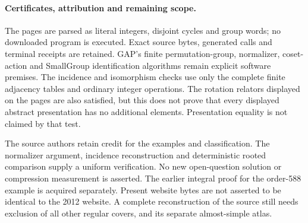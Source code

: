 \documentclass[11pt,a4paper]{article}
\begin{document}
\paragraph{Certificates, attribution and remaining scope.}
The pages are parsed as literal integers, disjoint cycles and group
words; no downloaded program is executed. Exact source bytes, generated
calls and terminal receipts are retained. GAP's finite permutation-group,
normalizer, coset-action and SmallGroup identification algorithms remain
explicit software premises. The incidence and isomorphism checks use
only the complete finite adjacency tables and ordinary integer operations.
The rotation relators displayed on the pages are also satisfied, but
this does not prove that every displayed abstract presentation has no
additional elements. Presentation equality is not claimed by that test.

The source authors retain credit for the examples and classification.
The normalizer argument, incidence reconstruction and deterministic
rooted comparison supply a uniform verification. No new open-question
solution or compression measurement is asserted. The earlier integral
proof for the order-588 example is acquired separately. Present website
bytes are not asserted to be identical to the 2012 website. A complete
reconstruction of the source still needs exclusion of all other regular
covers, and its separate almost-simple atlas.
\end{document}
